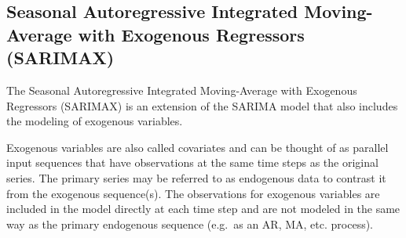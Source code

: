 \subsection{Seasonal Autoregressive Integrated Moving-Average with
Exogenous Regressors
(SARIMAX)}\label{seasonal-autoregressive-integrated-moving-average-with-exogenous-regressors-sarimax}

The Seasonal Autoregressive Integrated Moving-Average with Exogenous
Regressors (SARIMAX) is an extension of the SARIMA model that also
includes the modeling of exogenous variables.

Exogenous variables are also called covariates and can be thought of as
parallel input sequences that have observations at the same time steps
as the original series. The primary series may be referred to as
endogenous data to contrast it from the exogenous sequence(s). The
observations for exogenous variables are included in the model directly
at each time step and are not modeled in the same way as the primary
endogenous sequence (e.g.~as an AR, MA, etc. process).

%

